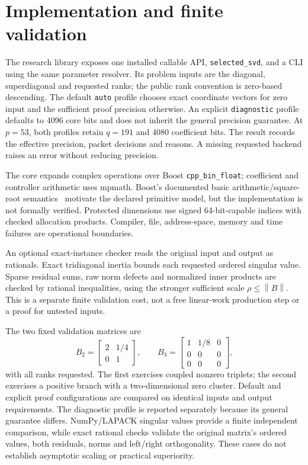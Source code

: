 \documentclass[11pt]{article}
\theoremstyle{remark}\newtheorem{remark}[theorem]{Remark}
\newcommand{\norm}[1]{\left\lVert#1\right\rVert}
\begin{document}
\section{Implementation and finite validation}\label{sec:software}
The research library exposes one installed callable API, \texttt{selected\_svd},
and a CLI using the same parameter resolver. Its problem inputs are the
diagonal, superdiagonal and requested ranks; the public rank convention is
zero-based descending. The default \texttt{auto} profile chooses exact
coordinate vectors for zero input and the sufficient proof precision otherwise.
An explicit \texttt{diagnostic} profile defaults to 4096 core bits and does
not inherit the general precision guarantee. At $p=53$, both profiles retain
$q=191$ and 4080 coefficient bits. The result records the effective precision,
packet decisions and reasons. A missing requested backend raises an error
without reducing precision.

The core expands complex operations over Boost \texttt{cpp\_bin\_float};
coefficient and controller arithmetic uses mpmath. Boost's documented basic
arithmetic/square-root semantics~\cite{Boost} motivate the declared primitive
model, but the implementation is not formally verified. Protected dimensions
use signed 64-bit-capable indices with checked allocation products. Compiler,
file, address-space, memory and time failures are operational boundaries.

An optional exact-instance checker reads the original input and output as
rationals. Exact tridiagonal inertia bounds each requested ordered singular
value. Sparse residual sums, raw norm defects and normalized inner products
are checked by rational inequalities, using the stronger sufficient scale
$\rho\le\norm B$. This is a separate finite validation cost, not a free
linear-work production step or a proof for untested inputs.

The two fixed validation matrices are
\[
 B_2=\begin{bmatrix}2&1/4\\0&1\end{bmatrix},\qquad
 B_3=\begin{bmatrix}1&1/8&0\\0&0&0\\0&0&0\end{bmatrix},
\]
with all ranks requested. The first exercises coupled nonzero triplets; the
second exercises a positive branch with a two-dimensional zero cluster.
Default and explicit proof configurations are compared on identical inputs
and output requirements. The diagnostic profile is reported separately because
its general guarantee differs. NumPy/LAPACK singular values provide a finite
independent comparison, while exact rational checks validate the original
matrix's ordered values, both residuals, norms and left/right orthogonality.
These cases do not establish asymptotic scaling or practical superiority.
\end{document}
